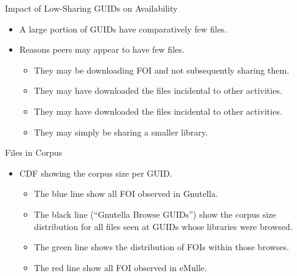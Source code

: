 \documentclass[notes]{beamer}
\begin{document}
\begin{frame}
\begin{block}{Impact of Low-Sharing GUIDs on Availability}
\begin{itemize}
\item[\checkmark] A large portion of GUIDs have comparatively few files. 
\item[\checkmark] Reasons peers may appear to have few files.
\begin{itemize}
\item[\checkmark] They may be downloading FOI and not subsequently sharing them.
\item[\checkmark] They may have downloaded the files incidental to other activities.
\item[\checkmark] They may have downloaded the files incidental to other activities.
\item[\checkmark] They may simply be sharing a smaller library.
\end{itemize}

\end{itemize}
\end{block}
\end{frame}
\begin{frame}
\begin{block}{Files in Corpus}
\begin{itemize}
\item[\checkmark] CDF showing the corpus size per GUID.
\begin{itemize}
\item[\checkmark] The blue line show all FOI observed in Gnutella.
\item[\checkmark] The black line (“Gnutella Browse GUIDs”) show the corpus size distribution for all files seen at GUIDs whose libraries were browsed.
\item[\checkmark] The green line shows the distribution of FOIs within those browses.
\item[\checkmark] The red line show all FOI observed in eMulle.
\end{itemize}
\end{itemize}

\end{block}
\end{frame}
\end{document}
